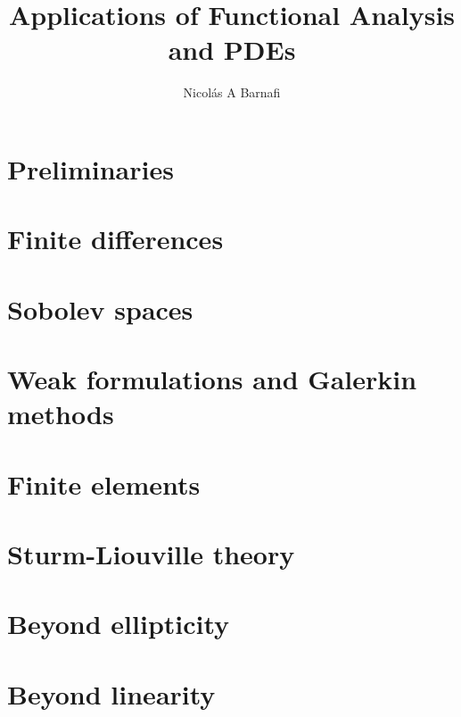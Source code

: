 \documentclass{scrbook}
\title{Applications of Functional Analysis and PDEs}
\author{Nicol\'as A Barnafi}
\date{} %
\begin{document}
\maketitle
\tableofcontents
\mainmatter



\chapter{Preliminaries}\label{chapter:preliminaries}

\chapter{Finite differences}\label{chapter:finite-differences}

\chapter{Sobolev spaces}\label{chapter:sobolev}

\chapter{Weak formulations and Galerkin methods}\label{chapter:weak-forms-galerkin}

\chapter{Finite elements}\label{chapter:fem}

\chapter{Sturm-Liouville theory}\label{chapter:sturm-liouville}

\chapter{Beyond ellipticity}\label{chapter:beyond-ellipticity}

\chapter{Beyond linearity}\label{chapter:nonlinear}

\end{document}
